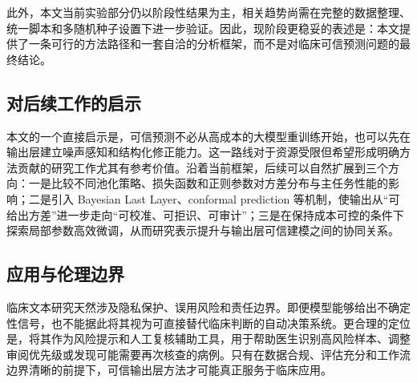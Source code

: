 此外，本文当前实验部分仍以阶段性结果为主，相关趋势尚需在完整的数据整理、统一脚本和多随机种子设置下进一步验证。因此，现阶段更稳妥的表述是：本文提供了一条可行的方法路径和一套自洽的分析框架，而不是对临床可信预测问题的最终结论。

\subsection{对后续工作的启示}
本文的一个直接启示是，可信预测不必从高成本的大模型重训练开始，也可以先在输出层建立噪声感知和结构化修正能力。这一路线对于资源受限但希望形成明确方法贡献的研究工作尤其有参考价值。沿着当前框架，后续可以自然扩展到三个方向：一是比较不同池化策略、损失函数和正则参数对方差分布与主任务性能的影响；二是引入 Bayesian Last Layer、conformal prediction 等机制，使输出从“可给出方差”进一步走向“可校准、可拒识、可审计”；三是在保持成本可控的条件下探索局部参数高效微调，从而研究表示提升与输出层可信建模之间的协同关系。

\subsection{应用与伦理边界}
临床文本研究天然涉及隐私保护、误用风险和责任边界。即便模型能够给出不确定性信号，也不能据此将其视为可直接替代临床判断的自动决策系统。更合理的定位是，将其作为风险提示和人工复核辅助工具，用于帮助医生识别高风险样本、调整审阅优先级或发现可能需要再次核查的病例。只有在数据合规、评估充分和工作流边界清晰的前提下，可信输出层方法才可能真正服务于临床应用。
